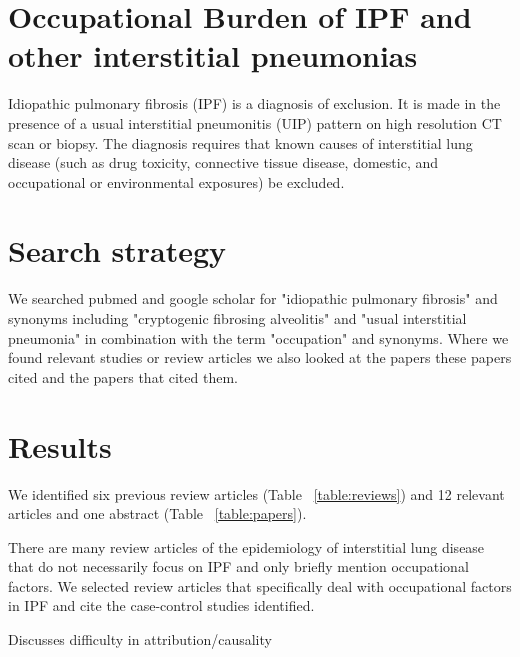 \documentclass[a4paper,12pt]{article}
\author{Carl Reynolds \\
\small National Heart \& Lung Institute, Imperial College London }
\begin{document}


\section*{\centering Occupational Burden of IPF and other interstitial pneumonias}

Idiopathic pulmonary fibrosis (IPF) is a diagnosis of exclusion. It is made in the
presence of a usual interstitial pneumonitis (UIP) pattern on high resolution CT scan
or biopsy. The diagnosis requires that known causes of interstitial lung disease
(such as drug toxicity, connective tissue disease, domestic, and occupational or
environmental exposures) be excluded\cite{Travis2013}.



\section{Search strategy}

We searched pubmed and google scholar for "idiopathic pulmonary fibrosis" and synonyms including "cryptogenic fibrosing alveolitis" and "usual interstitial pneumonia" in combination with the term "occupation" and synonyms. Where we found relevant studies or review articles we also looked at the papers these papers cited and the papers that cited them. 

\section{Results}

We identified six previous review articles (Table ~\ref{table:reviews})\cite{Turner-Warwick1998} and 12 relevant articles and one abstract (Table ~\ref{table:papers}).

There are many review articles of the epidemiology of interstitial lung disease that do not necessarily focus on IPF and only briefly mention occupational factors. We selected review articles that specifically deal with occupational factors in IPF and cite the case-control studies identified.



%
\cite{Turner-Warwick1998} Discusses difficulty in attribution/causality
\end{document}
